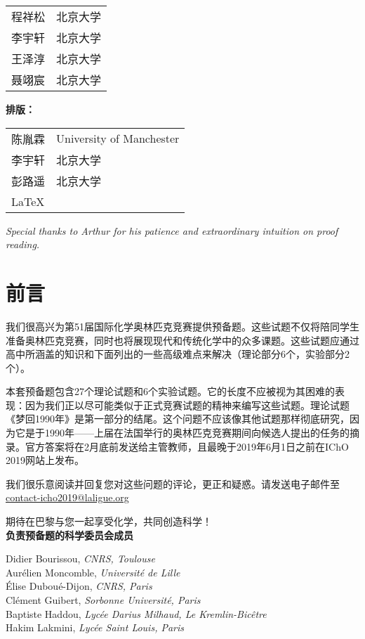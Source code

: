 \documentclass[10.5pt]{report}
\newcommand{\mysection}[1]{
	\section*{#1}
	\addcontentsline{toc}{section}{#1}
}%
\begin{document}
\begin{longtable}{p{2cm}p{12cm} }  %
	程祥松&北京大学\\
	李宇轩&北京大学\\
	王泽淳&北京大学\\
	聂翊宸&北京大学\\
\end{longtable}
\textbf{排版：}

\begin{longtable}{p{2cm}p{12cm} }  %
	陈胤霖&University of Manchester\\
	李宇轩&北京大学\\
	彭路遥&北京大学\\
	\LaTeX
\end{longtable}
\textit{Special thanks to Arthur for his patience and extraordinary intuition on proof reading.}

\newpage
\mysection{前言}
我们很高兴为第51届国际化学奥林匹克竞赛提供预备题。这些试题不仅将陪同学生准备奥林匹克竞赛，同时也将展现现代和传统化学中的众多课题。这些试题应通过高中所涵盖的知识和下面列出的一些高级难点来解决（理论部分6个，实验部分2个）。

本套预备题包含27个理论试题和6个实验试题。它的长度不应被视为其困难的表现：因为我们正以尽可能类似于正式竞赛试题的精神来编写这些试题。理论试题《梦回1990年》是第一部分的结尾。这个问题不应该像其他试题那样彻底研究，因为它是于1990年——上届在法国举行的奥林匹克竞赛期间向候选人提出的任务的摘录。官方答案将在2月底前发送给主管教师，且最晚于2019年6月1日之前在IChO 2019网站上发布。

我们很乐意阅读并回复您对这些问题的评论，更正和疑惑。请发送电子邮件至\href{contact-icho2019@laligue.org}{contact-icho2019@laligue.org}

期待在巴黎与您一起享受化学，共同创造科学！\\

\hspace*{\fill} \textbf{负责预备题的科学委员会成员}\\

\begin{flushright}
Didier Bourissou, \textit{CNRS, Toulouse}\\
Aurélien Moncomble, \textit{Université de Lille}\\
Élise Duboué-Dijon, \textit{CNRS, Paris}\\
Clément Guibert, \textit{Sorbonne Université, Paris}\\
Baptiste Haddou, \textit{Lycée Darius Milhaud, Le Kremlin-Bicêtre}\\
Hakim Lakmini, \textit{Lycée Saint Louis, Paris}\\
\end {flushright}
\end{document}
